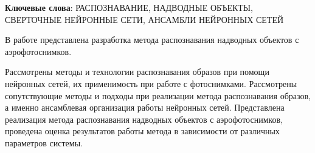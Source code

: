 \begin{essay}{}
    \noindent\textbf{Ключевые слова}: РАСПОЗНАВАНИЕ, НАДВОДНЫЕ ОБЪЕКТЫ, СВЕРТОЧНЫЕ НЕЙРОННЫЕ СЕТИ, АНСАМБЛИ НЕЙРОННЫХ СЕТЕЙ
    
    В работе представлена разработка метода распознавания надводных объектов с аэрофотоснимков.
    
    
    Рассмотрены методы и технологии распознавания образов при помощи нейронных сетей, их применимость при работе с фотоснимками. Рассмотрены сопутствующие методы и подходы при реализации метода распознавания образов, а именно ансамблевая организация работы нейронных сетей. Представлена реализация метода распознавания надводных объектов с аэрофотоснимков, проведена оценка результатов работы метода в зависимости от различных параметров системы.

\end{essay}